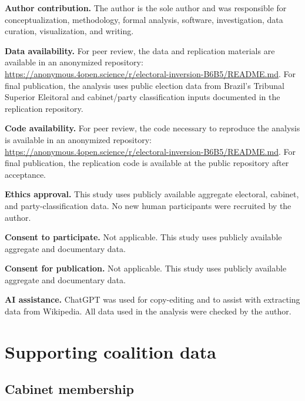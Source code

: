 \documentclass[11pt]{article}
\begin{document}
\textbf{Author contribution.} The author is the sole author and was responsible for conceptualization, methodology, formal analysis, software, investigation, data curation, visualization, and writing.

\textbf{Data availability.} For peer review, the data and replication materials are available in an anonymized repository: \url{https://anonymous.4open.science/r/electoral-inversion-B6B5/README.md}. For final publication, the analysis uses public election data from Brazil's Tribunal Superior Eleitoral and cabinet/party classification inputs documented in the replication repository.

\textbf{Code availability.} For peer review, the code necessary to reproduce the analysis is available in an anonymized repository: \url{https://anonymous.4open.science/r/electoral-inversion-B6B5/README.md}. For final publication, the replication code is available at the public repository after acceptance.

\textbf{Ethics approval.} This study uses publicly available aggregate electoral, cabinet, and party-classification data. No new human participants were recruited by the author. 

\textbf{Consent to participate.} Not applicable. This study uses publicly available aggregate and documentary data.

\textbf{Consent for publication.} Not applicable. This study uses publicly available aggregate and documentary data.

\textbf{AI assistance.} ChatGPT was used for copy-editing and to assist with extracting data from Wikipedia. All data used in the analysis were checked by the author.


\printbibliography


\clearpage
\appendix

\section{Supporting coalition data}
\label{app:accounting-diagnostics}

\subsection{Cabinet membership}
\label{app:composition}


\end{document}
